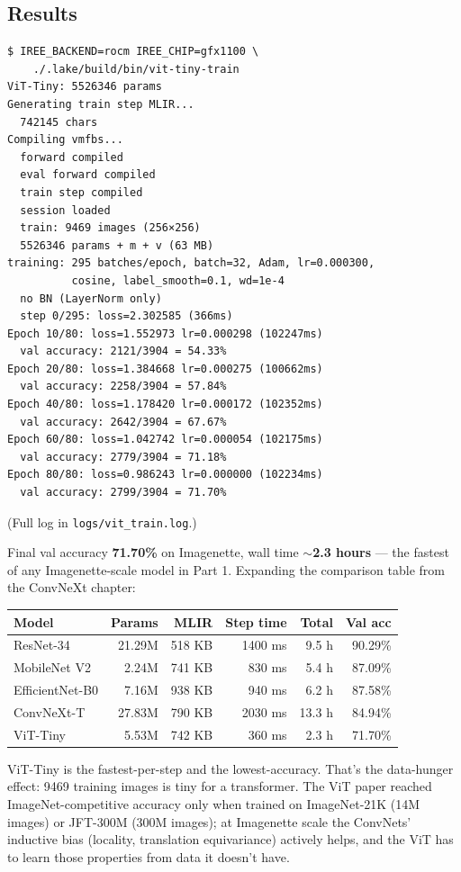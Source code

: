 \subsection*{Results}

\begin{verbatim}
$ IREE_BACKEND=rocm IREE_CHIP=gfx1100 \
    ./.lake/build/bin/vit-tiny-train
ViT-Tiny: 5526346 params
Generating train step MLIR...
  742145 chars
Compiling vmfbs...
  forward compiled
  eval forward compiled
  train step compiled
  session loaded
  train: 9469 images (256×256)
  5526346 params + m + v (63 MB)
training: 295 batches/epoch, batch=32, Adam, lr=0.000300,
          cosine, label_smooth=0.1, wd=1e-4
  no BN (LayerNorm only)
  step 0/295: loss=2.302585 (366ms)
Epoch 10/80: loss=1.552973 lr=0.000298 (102247ms)
  val accuracy: 2121/3904 = 54.33%
Epoch 20/80: loss=1.384668 lr=0.000275 (100662ms)
  val accuracy: 2258/3904 = 57.84%
Epoch 40/80: loss=1.178420 lr=0.000172 (102352ms)
  val accuracy: 2642/3904 = 67.67%
Epoch 60/80: loss=1.042742 lr=0.000054 (102175ms)
  val accuracy: 2779/3904 = 71.18%
Epoch 80/80: loss=0.986243 lr=0.000000 (102234ms)
  val accuracy: 2799/3904 = 71.70%
\end{verbatim}

(Full log in \texttt{logs/vit\_train.log}.)

Final val accuracy \textbf{71.70\%} on Imagenette, wall time
\textbf{$\sim$2.3 hours} --- the fastest of any Imagenette-scale
model in Part 1. Expanding the comparison table from the
ConvNeXt chapter:

\begin{center}
\begin{tabular}{l r r r r r}
\hline
Model            & Params  & MLIR     & Step time & Total   & Val acc \\
\hline
ResNet-34        & 21.29M  & 518 KB   & 1400 ms   & 9.5 h   & 90.29\% \\
MobileNet V2     &  2.24M  & 741 KB   &  830 ms   & 5.4 h   & 87.09\% \\
EfficientNet-B0  &  7.16M  & 938 KB   &  940 ms   & 6.2 h   & 87.58\% \\
ConvNeXt-T       & 27.83M  & 790 KB   & 2030 ms   & 13.3 h  & 84.94\% \\
ViT-Tiny         &  5.53M  & 742 KB   &  360 ms   & 2.3 h   & 71.70\% \\
\hline
\end{tabular}
\end{center}

ViT-Tiny is the fastest-per-step and the lowest-accuracy. That's
the data-hunger effect: 9469 training images is tiny for a
transformer. The ViT paper reached ImageNet-competitive accuracy
only when trained on ImageNet-21K (14M images) or JFT-300M (300M
images); at Imagenette scale the ConvNets' inductive bias (locality,
translation equivariance) actively helps, and the ViT has to learn
those properties from data it doesn't have.

